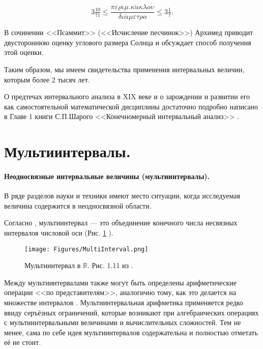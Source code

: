 \documentclass[a5paper,openany]{book}
\begin{document}
\begin{equation*}
3\tfrac{10}{71} \leq 
\dfrac{\pi \varepsilon \rho \acute{\iota} \mu. \kappa \acute{u} \kappa \lambda o \upsilon}{\delta \iota \acute{\alpha} \mu \varepsilon \tau \rho o} 
\leq 3\tfrac{1}{7}.
\end{equation*}

В сочинении <<Псаммит>> (<<Исчисление песчинок>>) Архимед приводит двустороннюю оценку углового размера Солнца и обсуждает способ получения этой оценки.

Таким образом, мы имеем свидетельства применения интервальных величин, которым более 2 тысяч лет.

О предтечах интервального анализа в XIX веке и о зарождении и развитии его как самостоятельной математической дисциплины достаточно подробно написано в Главе 1 книги С.П.Шарого <<Конечномерный интервальный анализ>> \cite{SharyBook}.

\section{Мультиинтервалы.}\label{s:MultiIntervals}

\paragraph{Неодносвязные интервальные величины (мультиинтервалы).}

В ряде разделов науки и техники имеют место ситуации, когда исследуемая величина  содержится в неодносвязной области. %

Согласно \cite{SharyBook}, мультиинтервал --- это объединение конечного числа несвязных интервалов числовой оси (Рис. \ref{f:MultiInterval} ). 

\begin{figure}[ht]
	\centering
	\texttt{[image: Figures/MultiInterval.png]}
	\caption{Мультиинтервал в $\mathbb{R}$. Рис. 1.11 из \cite{SharyBook}.}
	\label{f:MultiInterval} 
\end{figure}

Между мультиинтервалами также могут быть определены арифметические операции <<по представителям>>, аналогично тому, как это делается на множестве интервалов \cite{Iakovlev1968}.
Мультиинтервальная арифметика применяется редко ввиду серъёзных ограничений, которые возникают при алгебраических операциях с мультиинтервальными величинами и вычислительных сложностей. Тем не менее, сама по себе идея мультиинтервалов содержательна и полностью отметать её не стоит. 
\end{document}
